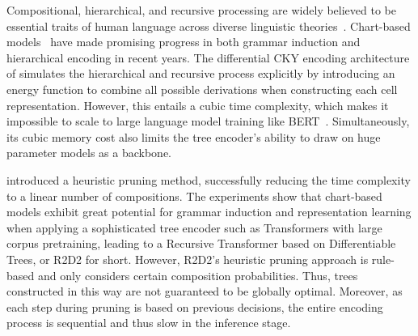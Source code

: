 Compositional, hierarchical, and recursive processing are widely believed to be essential traits of human language across diverse  linguistic theories~\cite{DBLP:journals/tit/Chomsky56,chomsky2014aspects}.
Chart-based models~\cite{DBLP:journals/corr/MaillardCY17,kim-etal-2019-compound,dblp:conf/naacl/drozdovvyim19,hu-etal-2021-r2d2} have made promising progress in both grammar induction and hierarchical encoding in recent years.
The differential CKY encoding architecture of  simulates 
the hierarchical and recursive process explicitly by introducing an energy function to combine all possible derivations when constructing each cell representation.
However, this entails a cubic time complexity, which makes it impossible to scale to large 
language model training like BERT~\cite{devlin2018}. 
Simultaneously, its cubic memory cost also limits the tree encoder's ability to draw on huge parameter models as a backbone.

 introduced a heuristic pruning method, successfully reducing the time complexity 
to a linear number of compositions.
The experiments show that chart-based models exhibit great potential for grammar induction and representation learning when applying a sophisticated tree encoder such as Transformers with large corpus pretraining, leading to a Recursive Transformer based on Differentiable Trees, or R2D2 for short.
However, R2D2's heuristic pruning approach is rule-based and only considers certain composition probabilities.
Thus, trees constructed in this way are not guaranteed to be globally optimal. Moreover, as each step during pruning is based on previous decisions, the entire encoding process is sequential and thus slow in the inference stage.

